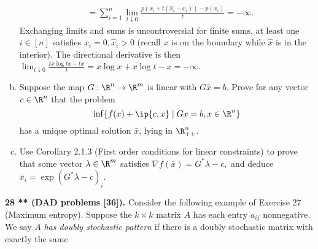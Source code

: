 \documentclass[../borwein-lewis_notes.tex]{subfiles}
\begin{document}
\begin{enumerate}[(a)]
{\begin{align*}
&= \sum_{i=1}^n \lim_{t\downarrow 0} \frac{p(x_i+t(\hat x_i-x_i))-p(x_i)}{
t} = -\infty.
\end{align*}
Exchanging limits and sums is uncontroversial for finite sums, at 
least one $i\in[n]$ satisfies $x_i=0, \hat x_i > 0$ (recall $x$ is on 
the boundary while $\hat x$ is in the interior). The directional 
derivative is then $\lim_{t\downarrow 0}\frac{tx\log tx - tx}{t} = 
x\log x + x\log t - x = -\infty$.
}
\item Suppose the map $G:\R^n\to\R^m$ is linear with $G\hat x = b$. 
Prove for any vector $c\in\R^n$ that the problem 
\begin{equation*}
\inf\{f(x)+\ip{c,x}\mid Gx=b, x\in\R^n\}
\end{equation*}
has a unique optimal solution $\bar x$, lying in $\R_{++}^n$. \\
\item Use Corollary 2.1.3 (First order conditions for linear constraints)
to prove that some vector $\lambda\in\R^m$ satisfies $\nabla f(\bar x)
= G^*\lambda - c,$ and deduce $\bar x_i = \exp(G^*\lambda -c)_i$. \\
\end{enumerate}
\textbf{28 ** (DAD problems [36]).} Consider the following example of 
Exercise 27 (Maximum entropy). Suppose the $k\times k$ matrix $A$ has 
each entry $a_{ij}$ nonnegative. We say $A$ \textit{has doubly stochastic
pattern} if there is a doubly stochastic matrix with exactly the same 
\end{document}
